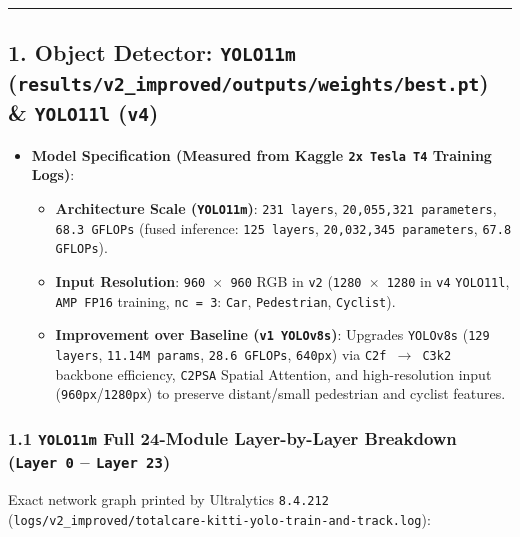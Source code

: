 \documentclass[10.5pt,a4paper]{article}
\begin{document}
\par\noindent\rule{\textwidth}{0.4pt}\par\medskip

\subsection{1. Object Detector: \texttt{YOLO11m} (\texttt{results/\allowbreak{}v2\_\allowbreak{}improved/\allowbreak{}outputs/\allowbreak{}weights/\allowbreak{}best.\allowbreak{}pt}) \& \texttt{YOLO11l} (\texttt{v4})}

\begin{itemize}[leftmargin=1.5em,itemsep=2pt]
\item \textbf{Model Specification (Measured from Kaggle \texttt{2x Tesla T4} Training Logs)}:
\begin{itemize}[leftmargin=1.5em,itemsep=2pt]
\item \textbf{Architecture Scale (\texttt{YOLO11m})}: \texttt{231 layers}, \texttt{20,\allowbreak{}055,\allowbreak{}321 parameters}, \texttt{68.\allowbreak{}3 GFLOPs} (fused inference: \texttt{125 layers}, \texttt{20,\allowbreak{}032,\allowbreak{}345 parameters}, \texttt{67.\allowbreak{}8 GFLOPs}).
\item \textbf{Input Resolution}: \texttt{960 $\times$ 960} RGB in \texttt{v2} (\texttt{1280 $\times$ 1280} in \texttt{v4} \texttt{YOLO11l}, \texttt{AMP FP16} training, \texttt{nc = 3}: \texttt{Car}, \texttt{Pedestrian}, \texttt{Cyclist}).
\item \textbf{Improvement over Baseline (\texttt{v1 YOLOv8s})}: Upgrades \texttt{YOLOv8s} (\texttt{129 layers}, \texttt{11.\allowbreak{}14M params}, \texttt{28.\allowbreak{}6 GFLOPs}, \texttt{640px}) via \texttt{C2f $\rightarrow$ C3k2} backbone efficiency, \texttt{C2PSA} Spatial Attention, and high-resolution input (\texttt{960px}/\texttt{1280px}) to preserve distant/small pedestrian and cyclist features.
\end{itemize}
\end{itemize}

\subsubsection{1.1 \texttt{YOLO11m} Full 24-Module Layer-by-Layer Breakdown (\texttt{Layer 0} -- \texttt{Layer 23})}

Exact network graph printed by Ultralytics \texttt{8.\allowbreak{}4.\allowbreak{}212} (\texttt{logs/\allowbreak{}v2\_\allowbreak{}improved/\allowbreak{}totalcare-\allowbreak{}kitti-\allowbreak{}yolo-\allowbreak{}train-\allowbreak{}and-\allowbreak{}track.\allowbreak{}log}):
\end{document}
